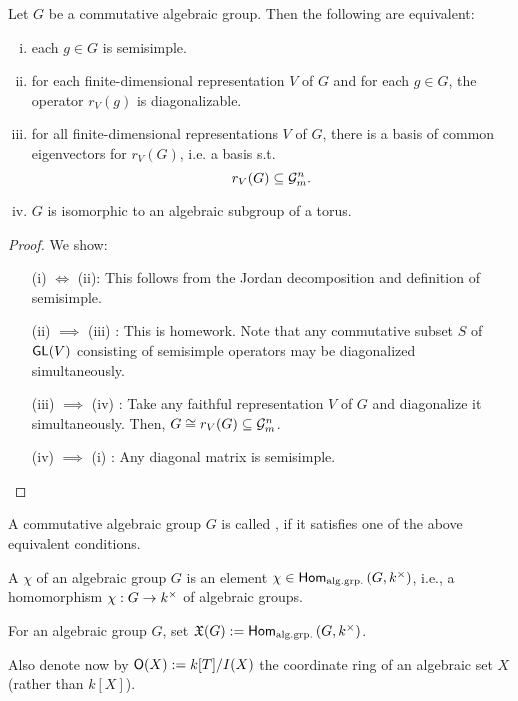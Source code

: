\begin{lemma}
	Let $G$ be a commutative algebraic group. Then the following are equivalent:
	\begin{enumerate}[(i)]
		\item each $g \in G$ is semisimple.
		\item for each finite-dimensional representation $V $ of $G$ and for each $g \in G$, the operator $r_V(g)$ is diagonalizable.
		\item for all finite-dimensional representations $V$ of $G$, there is a basis of common eigenvectors for $r_V(G)$, i.e. a basis s.t.
		\[ r_V(G) \subseteq \mathcal{G}_m^n. \]
		\item $G$ is isomorphic to an algebraic subgroup of a torus.
	\end{enumerate}
\end{lemma}
\begin{proof}
	We show:
	\begin{enumerate}
		\item[(i) $\iff$ (ii):] This follows from the Jordan decomposition and definition of semisimple.
		\item[(ii) $\implies$ (iii)]: This is homework. Note that any commutative subset $S$ of $\textsf{GL}(V)$ consisting of semisimple operators may be diagonalized simultaneously.
		\item[(iii) $\implies$ (iv)]: Take any faithful representation $V$ of $G$ and diagonalize it simultaneously. Then, $G \overset{}{\cong} r_V(G) \subseteq \mathcal{G}_m^n$.
		\item[(iv) $\implies$ (i)]: Any diagonal matrix is semisimple.
	\end{enumerate}
\end{proof}

\begin{definition}
	A commutative algebraic group $G$ is called , if it satisfies one of the above equivalent conditions.
\end{definition}
\begin{definition}
	A  $\chi$ of an algebraic group $G$ is an element $\chi \in \textsf{Hom}_{\mathrm{alg.grp.}}\left(G, k^\times\right)$, i.e., a homomorphism $\chi : G \overset{}{\rightarrow} k^\times$ of algebraic groups.
\end{definition}
\begin{notation}
For an algebraic group $G$, set $\mathfrak{X}(G) := \textsf{Hom}_{\mathrm{alg.grp.}}\left(G, k^\times\right)$.

Also denote now by $\mathsf{O}(X) := k[T] / I(X)$ the coordinate ring of an algebraic set $X$ (rather than $k[X]$).
\end{notation}

